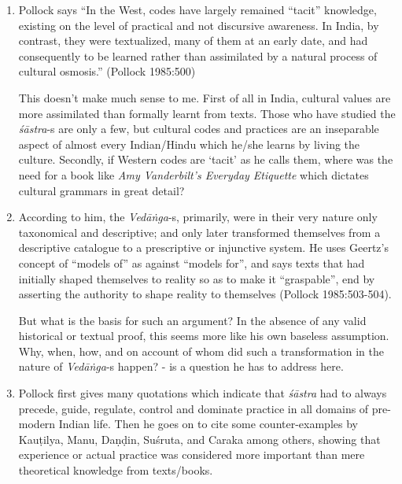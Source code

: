 \begin{enumerate}
\item Pollock says ``In the West, codes have largely remained ``tacit'' knowledge, existing on the level of practical and not discursive awareness. In India, by contrast, they were textualized, many of them at an early date, and had consequently to be learned rather than assimilated by a natural process of cultural osmosis.'' (Pollock 1985:500) 

This doesn't make much sense to me. First of all in India, cultural values are more assimilated than formally learnt from texts. Those who have studied the {\it śāstra}-s are only a few, but cultural codes and practices are an inseparable aspect of almost every Indian/Hindu which he/she learns by living the culture.  Secondly, if Western codes are `tacit' as he calls them, where was the need for a book like \textsl{Amy Vanderbilt's Everyday Etiquette}  which dictates cultural grammars in great detail?

\item According to him, the {\it Vedāṅga}-s,  primarily, were in their very nature only taxonomical and descriptive; and only later transformed themselves from a descriptive catalogue to a prescriptive or injunctive system. He uses Geertz's concept of ``models of'' as against ``models for'', and says texts that had initially shaped themselves to reality so as to make it ``graspable'', end by asserting the authority to shape reality to themselves (Pollock 1985:503-504). 

But what is the basis for such an argument? In the absence of any valid historical or textual proof, this seems more like his own baseless assumption. Why, when, how, and on account of whom did such a transformation in the nature of {\it Vedāṅga}-s happen? - is a question he has to address here.

\item Pollock first gives many quotations which indicate that {\it śāstra} had to always precede, guide, regulate, control and dominate practice in all domains of pre-modern Indian life. Then he goes on to cite some counter-examples by Kauṭilya, Manu, Daṇḍin, Suśruta, and Caraka among others, showing that experience or actual practice was considered more important than mere theoretical knowledge from texts/books. 


\end{enumerate}

